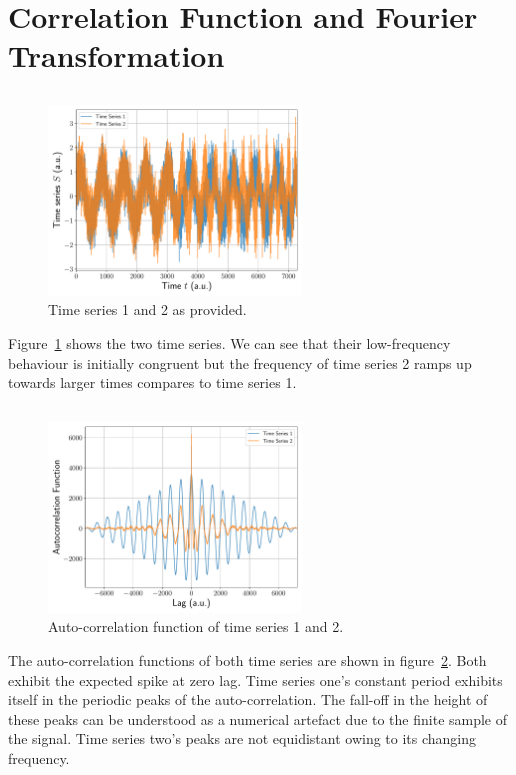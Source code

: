 \documentclass[a4paper,DIV=12,english]{scrartcl}
\begin{document}
\FloatBarrier
\newpage
\section{Correlation Function and Fourier Transformation}
\subsection{}
\begin{figure}[h]
    \centering
    \includegraphics[width=0.6\textwidth]{../ts.pdf}
    \caption{Time series 1 and 2 as provided.}
    \label{fig:ts3}
\end{figure}
Figure~\ref{fig:ts3} shows the two time series. We can see that their low-frequency behaviour is initially congruent but the frequency of time series 2 ramps up towards larger times compares to time series 1.
\subsection{}
\begin{figure}
    \centering
    \includegraphics[width=0.6\textwidth]{../ac.pdf}
    \caption{Auto-correlation function of time series 1 and 2.}
    \label{fig:ac}
\end{figure}
The auto-correlation functions of both time series are shown in figure~\ref{fig:ac}. Both exhibit the expected spike at zero lag. Time series one's constant period exhibits itself in the periodic peaks of the auto-correlation. The fall-off in the height of these peaks can be understood as a numerical artefact due to the finite sample of the signal. Time series two's peaks are not equidistant owing to its changing frequency.
\end{document}
